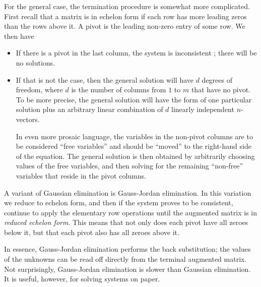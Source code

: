 \documentclass{article}
\begin{document}
For the general case, the termination procedure is somewhat more
complicated. First recall that a matrix is in echelon form if each
row has more leading zeros than the rows above it. A pivot is the
leading non-zero entry of some row. We then have
\begin{itemize}
\item If there is a pivot in the last column, the system is
inconsistent ; there will be no solutions.
\item If that is not the case, then the general solution will have $d$
degrees of freedom, where $d$ is the number of columns from $1$ to
$m$ that have no pivot. To be more precise, the general solution
will have the form of one particular solution plus an arbitrary linear
combination of $d$ linearly independent $n$-vectors.

In even more prosaic language, the variables in the non-pivot
columns are to be considered ``free variables'' and should be
``moved'' to the right-hand side of the equation. The general
solution is then obtained by arbitrarily choosing values of the free
variables, and then solving for the remaining ``non-free'' variables
that reside in the pivot columns.
\end{itemize}

A variant of Gaussian elimination is Gauss-Jordan elimination. In
this variation we reduce to echelon form, and then if the system
proves to be consistent, continue to apply the elementary row
operations until the augmented matrix is in {\em reduced echelon
form}. This means that not only does each pivot have all zeroes
below it, but that each pivot also has all zeroes above it.

In essence, Gauss-Jordan elimination performs the back substitution;
the values of the unknowns can be read off directly from the terminal
augmented matrix. Not surprisingly, Gauss-Jordan elimination is
slower than Gaussian elimination. It is useful, however, for solving
systems on paper.
\end{document}
